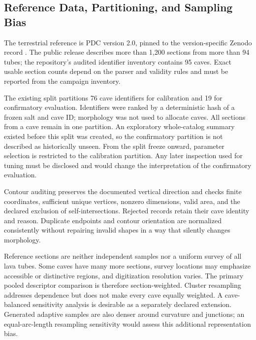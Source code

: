 \documentclass[conference]{IEEEtran}
\begin{document}
\subsection{Reference Data, Partitioning, and Sampling Bias}
The terrestrial reference is PDC version 2.0, pinned to the version-specific Zenodo record \cite{pdc2025}. The public release describes more than 1,200 sections from more than 94 tubes; the repository's audited identifier inventory contains 95 caves. Exact usable section counts depend on the parser and validity rules and must be reported from the campaign inventory.

The existing split partitions 76 cave identifiers for calibration and 19 for confirmatory evaluation. Identifiers were ranked by a deterministic hash of a frozen salt and cave ID; morphology was not used to allocate caves. All sections from a cave remain in one partition. An exploratory whole-catalog summary existed before this split was created, so the confirmatory partition is not described as historically unseen. From the split freeze onward, parameter selection is restricted to the calibration partition. Any later inspection used for tuning must be disclosed and would change the interpretation of the confirmatory evaluation.

Contour auditing preserves the documented vertical direction and checks finite coordinates, sufficient unique vertices, nonzero dimensions, valid area, and the declared exclusion of self-intersections. Rejected records retain their cave identity and reason. Duplicate endpoints and contour orientation are normalized consistently without repairing invalid shapes in a way that silently changes morphology.

Reference sections are neither independent samples nor a uniform survey of all lava tubes. Some caves have many more sections, survey locations may emphasize accessible or distinctive regions, and digitization resolution varies. The primary pooled descriptor comparison is therefore section-weighted. Cluster resampling addresses dependence but does not make every cave equally weighted. A cave-balanced sensitivity analysis is desirable as a separately declared extension. Generated adaptive samples are also denser around curvature and junctions; an equal-arc-length resampling sensitivity would assess this additional representation bias.
\end{document}
